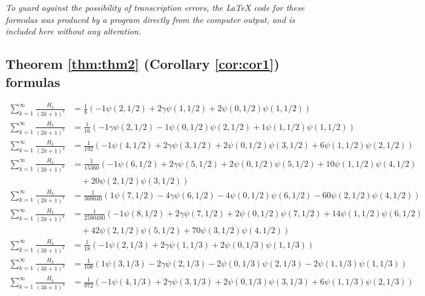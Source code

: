 \documentclass{article}
\theoremstyle{definition}
\begin{document}
\emph{To guard against the possibility of transcription errors, the LaTeX code for these formulas was produced by a program directly from the computer output, and is included here without any alteration.}


\subsection{Theorem \ref{thm:thm2} (Corollary \ref{cor:cor1}) formulas} \label{sec:catcor1}

\begin{align}
\sum_{k=1}^\infty \frac{H_k}{(2k+1)^2} &= \frac{1}{8}\left( -1\psi(2,1/2) +2\gamma\psi(1,1/2) +2\psi(0,1/2)\psi(1,1/2)\right) \\
\sum_{k=1}^\infty \frac{H_k}{(2k+1)^3} &= \frac{ 1}{16}\left( -1\gamma\psi(2,1/2) -1\psi(0,1/2)\psi(2,1/2) +1\psi(1,1/2)\psi(1,1/2)\right) \\
\sum_{k=1}^\infty \frac{H_k}{(2k+1)^4} &= \frac{1}{192}\left( -1\psi(4,1/2) +2\gamma\psi(3,1/2) +2\psi(0,1/2)\psi(3,1/2) +6\psi(1,1/2)\psi(2,1/2)\right) \\
\sum_{k=1}^\infty \frac{H_k}{(2k+1)^6} &= \frac{ 1}{15360}\left( -1\psi(6,1/2) +2\gamma\psi(5,1/2) +2\psi(0,1/2)\psi(5,1/2) +10\psi(1,1/2)\psi(4,1/2)  \right. \nonumber \\ &\left. \hspace{1em}
+20\psi(2,1/2)\psi(3,1/2)\right) \\
\sum_{k=1}^\infty \frac{H_k}{(2k+1)^7} &= \frac{1}{368640}\left(  1\psi(7,1/2) -4\gamma\psi(6,1/2) -4\psi(0,1/2)\psi(6,1/2) -60\psi(2,1/2)\psi(4,1/2)\right) \\
\sum_{k=1}^\infty \frac{H_k}{(2k+1)^8} &= \frac{1}{2580480}\left( -1\psi(8,1/2) +2\gamma\psi(7,1/2) +2\psi(0,1/2)\psi(7,1/2) +14\psi(1,1/2)\psi(6,1/2)  \right. \nonumber \\ &\left. \hspace{1em}
+42\psi(2,1/2)\psi(5,1/2) +70\psi(3,1/2)\psi(4,1/2)\right) \\
\sum_{k=1}^\infty \frac{H_k}{(3k+1)^2} &= \frac{1}{18}\left( -1\psi(2,1/3) +2\gamma\psi(1,1/3) +2\psi(0,1/3)\psi(1,1/3)\right) \\
\sum_{k=1}^\infty \frac{H_k}{(3k+1)^3} &= \frac{ 1}{108}\left(  1\psi(3,1/3) -2\gamma\psi(2,1/3) -2\psi(0,1/3)\psi(2,1/3) -2\psi(1,1/3)\psi(1,1/3)\right) \\
\sum_{k=1}^\infty \frac{H_k}{(3k+1)^4} &= \frac{ 1}{972}\left( -1\psi(4,1/3) +2\gamma\psi(3,1/3) +2\psi(0,1/3)\psi(3,1/3) +6\psi(1,1/3)\psi(2,1/3)\right) \\

\end{align}
\end{document}
